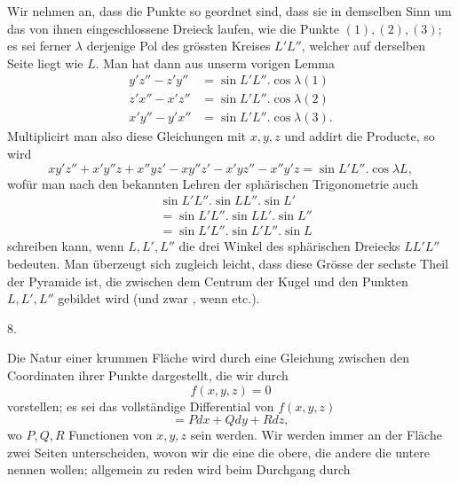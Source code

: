 \par{}%
\noindent\hspace*{1.2em}Wir nehmen an, dass die Punkte so geordnet sind, dass sie in demselben Sinn um das von ihnen eingeschlossene Dreieck laufen, wie die Punkte $(1),(2),(3)$; es sei ferner $\lambda$ derjenige Pol des grössten Kreises $L'L''$, welcher auf derselben Seite liegt wie $L$. Man hat dann aus unserm vorigen Lemma
\[
\begin{aligned}
y'z''-z'y''&=\sin L'L''.\cos\lambda(1)\\
z'x''-x'z''&=\sin L'L''.\cos\lambda(2)\\
x'y''-y'x''&=\sin L'L''.\cos\lambda(3).
\end{aligned}
\]
Multiplicirt man also diese Gleichungen mit $x,y,z$ und addirt die Producte, so wird
\[
xy'z''+x'y''z+x''yz'-xy''z'-x'yz''-x''y'z=\sin L'L''.\cos\lambda L,
\]
wofür man nach den bekannten Lehren der sphärischen Trigonometrie auch
\[
\begin{aligned}
&\sin L'L''.\sin LL''.\sin L'\\
&=\sin L'L''.\sin LL'.\sin L''\\
&=\sin L'L''.\sin L'L''.\sin L
\end{aligned}
\]
schreiben kann, wenn $L,L',L''$ die drei Winkel des sphärischen Dreiecks $LL'L''$ bedeuten. Man überzeugt sich zugleich leicht, dass diese Grösse der sechste Theil der Pyramide ist, die zwischen dem Centrum der Kugel und den Punkten $L,L',L''$ gebildet wird (und zwar , wenn etc.).

\begin{center}8.\end{center}
\noindent\hspace*{1.2em}Die Natur einer krummen Fläche wird durch eine Gleichung zwischen den Coordinaten ihrer Punkte dargestellt, die wir durch
\[
f(x,y,z)=0
\]
vorstellen; es sei das vollständige Differential von $f(x,y,z)$
\[
=Pdx+Qdy+Rdz,
\]
wo $P,Q,R$ Functionen von $x,y,z$ sein werden. Wir werden immer an der Fläche zwei Seiten unterscheiden, wovon wir die eine die obere, die andere die untere nennen wollen; allgemein zu reden wird beim Durchgang durch
